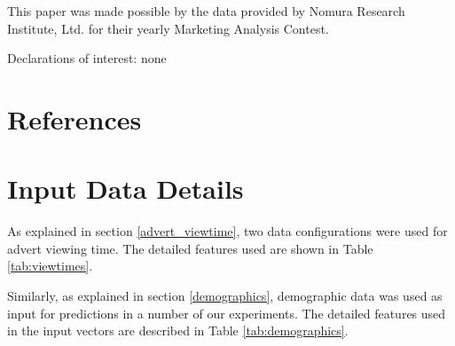 \documentclass[review]{elsarticle}
\begin{document}
This paper was made possible by the data provided by Nomura Research Institute, Ltd. for their yearly Marketing Analysis Contest.

Declarations of interest: none

\section*{References}



\clearpage
\appendix
\appendixpage

\section{Input Data Details}
\label{appendix:inputs}

As explained in section \ref{advert_viewtime}, two data configurations were used for advert viewing time. The detailed features used are shown in Table \ref{tab:viewtimes}. 

Similarly, as explained in section \ref{demographics}, demographic data was used as input for predictions in a number of our experiments. The detailed features used in the input vectors are described in Table \ref{tab:demographics}.
\end{document}
